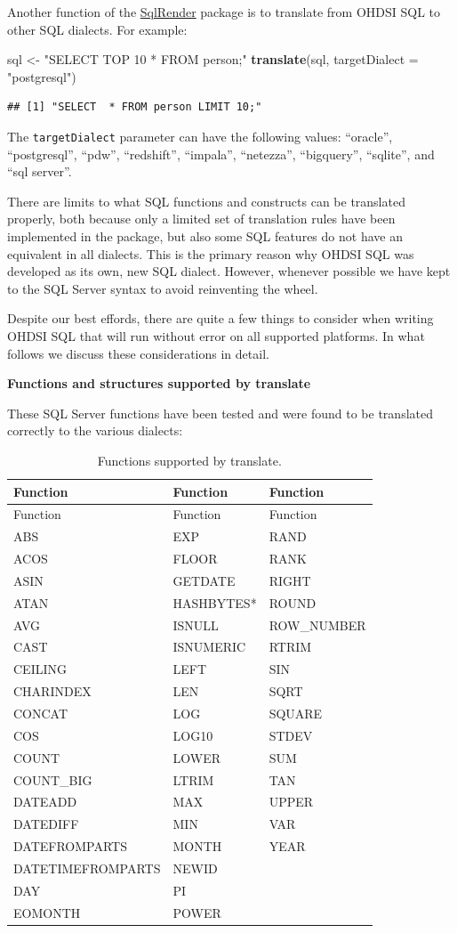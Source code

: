 \documentclass[11pt]{book}
\newenvironment{Shaded}{\begin{snugshade}}{\end{snugshade}}
\newcommand{\KeywordTok}[1]{\textcolor[rgb]{0.13,0.29,0.53}{\textbf{#1}}}
\newcommand{\DataTypeTok}[1]{\textcolor[rgb]{0.13,0.29,0.53}{#1}}
\newcommand{\StringTok}[1]{\textcolor[rgb]{0.31,0.60,0.02}{#1}}
\newcommand{\NormalTok}[1]{#1}
\let\BeginKnitrBlock\begin \let\EndKnitrBlock\end
\begin{document}
Another function of the
\href{https://ohdsi.github.io/SqlRender/}{SqlRender} package is to
translate from OHDSI SQL to other SQL dialects. For example:

\begin{Shaded}
\begin{Highlighting}[]
\NormalTok{sql <-}\StringTok{ "SELECT TOP 10 * FROM person;"}
\KeywordTok{translate}\NormalTok{(sql, }\DataTypeTok{targetDialect =} \StringTok{"postgresql"}\NormalTok{)}
\end{Highlighting}
\end{Shaded}

\begin{verbatim}
## [1] "SELECT  * FROM person LIMIT 10;"
\end{verbatim}

The \texttt{targetDialect} parameter can have the following values:
``oracle'', ``postgresql'', ``pdw'', ``redshift'', ``impala'',
``netezza'', ``bigquery'', ``sqlite'', and ``sql server''.

\BeginKnitrBlock{rmdimportant}
There are limits to what SQL functions and constructs can be translated
properly, both because only a limited set of translation rules have been
implemented in the package, but also some SQL features do not have an
equivalent in all dialects. This is the primary reason why OHDSI SQL was
developed as its own, new SQL dialect. However, whenever possible we
have kept to the SQL Server syntax to avoid reinventing the wheel.
\EndKnitrBlock{rmdimportant}

Despite our best effords, there are quite a few things to consider when
writing OHDSI SQL that will run without error on all supported
platforms. In what follows we discuss these considerations in detail.

\textbf{Functions and structures supported by translate}

These SQL Server functions have been tested and were found to be
translated correctly to the various dialects:

\begin{longtable}[]{@{}lll@{}}
\caption{\label{tab:sqlFunctions} Functions supported by
translate.}\tabularnewline
\toprule
Function & Function & Function\tabularnewline
\midrule
\endfirsthead
\toprule
Function & Function & Function\tabularnewline
\midrule
\endhead
ABS & EXP & RAND\tabularnewline
ACOS & FLOOR & RANK\tabularnewline
ASIN & GETDATE & RIGHT\tabularnewline
ATAN & HASHBYTES* & ROUND\tabularnewline
AVG & ISNULL & ROW\_NUMBER\tabularnewline
CAST & ISNUMERIC & RTRIM\tabularnewline
CEILING & LEFT & SIN\tabularnewline
CHARINDEX & LEN & SQRT\tabularnewline
CONCAT & LOG & SQUARE\tabularnewline
COS & LOG10 & STDEV\tabularnewline
COUNT & LOWER & SUM\tabularnewline
COUNT\_BIG & LTRIM & TAN\tabularnewline
DATEADD & MAX & UPPER\tabularnewline
DATEDIFF & MIN & VAR\tabularnewline
DATEFROMPARTS & MONTH & YEAR\tabularnewline
DATETIMEFROMPARTS & NEWID &\tabularnewline
DAY & PI &\tabularnewline
EOMONTH & POWER &\tabularnewline
\bottomrule
\end{longtable}
\end{document}
